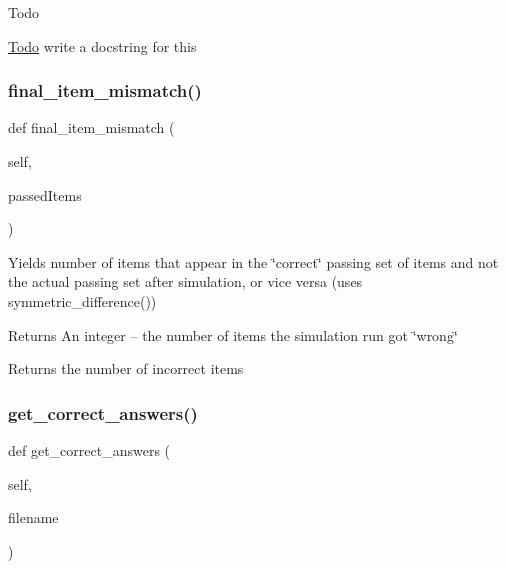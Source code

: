 \begin{DoxyRefDesc}{Todo}
\item[\mbox{\hyperlink{todo__todo000002}{Todo}}]write a docstring for this \end{DoxyRefDesc}
\mbox{\label{classdynamicfilterapp_1_1test__simulations_1_1_simulation_test_ae535f7d0761a00bc82b9fdcd19556403}} 
\subsubsection{\texorpdfstring{final\_item\_mismatch()}{final\_item\_mismatch()}}
{\footnotesize\ttfamily def final\+\_\+item\+\_\+mismatch (\begin{DoxyParamCaption}\item[{}]{self,  }\item[{}]{passed\+Items }\end{DoxyParamCaption})}



Yields number of items that appear in the \char`\"{}correct\char`\"{} passing set of items and not the actual passing set after simulation, or vice versa (uses symmetric\+\_\+difference()) 

\begin{DoxyReturn}{Returns}
An integer -- the number of items the simulation run got \char`\"{}wrong\char`\"{} \begin{DoxyVerb}Returns the number of incorrect items
\end{DoxyVerb}
 
\end{DoxyReturn}
\mbox{\label{classdynamicfilterapp_1_1test__simulations_1_1_simulation_test_a395b393866987a38160e3a44d9958d92}} 
\subsubsection{\texorpdfstring{get\_correct\_answers()}{get\_correct\_answers()}}
{\footnotesize\ttfamily def get\+\_\+correct\+\_\+answers (\begin{DoxyParamCaption}\item[{}]{self,  }\item[{}]{filename }\end{DoxyParamCaption})}



